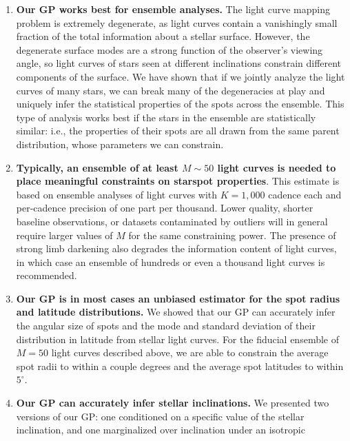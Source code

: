 \documentclass[modern,linenumbers]{aastex62}
\begin{document}
\begin{enumerate}
    \item \textbf{Our GP works best for ensemble analyses.} The light curve mapping
          problem is extremely degenerate, as light curves contain a vanishingly small
          fraction of the total information about a stellar surface. However, the
          degenerate surface modes are a strong function of the observer's viewing
          angle, so light curves of stars seen at different inclinations constrain
          different components of the surface. We have shown that if we jointly
          analyze the light curves of many stars,
          we can break many of the degeneracies at play and uniquely infer the
          statistical properties of the spots across the ensemble. This type
          of analysis works best if the stars in the ensemble are statistically
          similar: i.e., the properties of their spots are all drawn from the
          same parent distribution, whose parameters we can constrain.
    \item \textbf{Typically, an ensemble of at least $M \sim 50$ light curves
              is needed to place meaningful constraints on starspot properties}.
          This estimate is based on ensemble analyses of light curves with
          $K = 1{,}000$ cadence each and per-cadence precision of one part
          per thousand. Lower quality, shorter baseline observations, or
          datasets contaminated by outliers will in general require larger values
          of $M$ for the same constraining power. The presence of strong limb
          darkening also degrades the information content of light curves, in
          which case an ensemble of hundreds or even a thousand light curves
          is recommended.
    \item \textbf{Our GP is in most cases an unbiased estimator for the spot radius and
              latitude distributions.} We showed that our GP can accurately infer the
          angular size of spots and the mode and standard deviation of their
          distribution in latitude from stellar light curves. For the fiducial
          ensemble of $M = 50$ light curves described above, we are able to
          constrain the average spot radii to within a couple degrees and the
          average spot latitudes to within $5^\circ$.
    \item \textbf{Our GP can accurately infer stellar inclinations.} We presented
          two versions of our GP: one conditioned on a specific value of the stellar
          inclination, and one marginalized over inclination under an isotropic

\end{enumerate}
\end{document}

